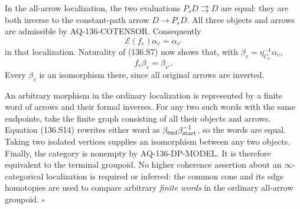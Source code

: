 In the all-arrow localization, the two evaluations
$P_sD\rightrightarrows D$ are equal: they are both
inverse to the constant-path arrow $D\to P_sD$.
All three objects and arrows are admissible by
AQ-136-COTENSOR. Consequently
\[
                   \mathcal E(f_e)\alpha_v=\alpha_{v'}
\]
in that localization. Naturality of (136.S7) now
shows that, with $\beta_v=\eta_{C_v}^{-1}\alpha_v$,
\[
                               f_e\beta_v=\beta_{v'}.
                                                               \tag{136.S14}
\]
Every $\beta_v$ is an isomorphism there, since all
original arrows are inverted.

An arbitrary morphism in the ordinary localization
is represented by a finite word of arrows and
their formal inverses. For any two such words with
the same endpoints, take the finite graph consisting
of all their objects and arrows. Equation (136.S14)
rewrites either word as
$\beta_{\rm end}\beta_{\rm start}^{-1}$, so the words
are equal. Taking two isolated vertices supplies
an isomorphism between any two objects. Finally,
the category is nonempty by AQ-136-DP-MODEL.
It is therefore equivalent to the terminal groupoid.
No higher coherence assertion about an
$\infty$-categorical localization is required or
inferred: the common cone and its edge homotopies
are used to compare arbitrary \emph{finite words}
in the ordinary all-arrow groupoid. \hfill$\square$

